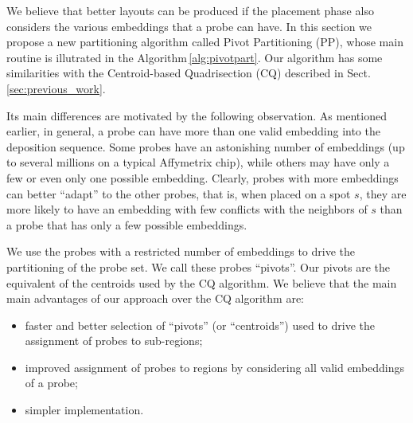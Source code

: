 \documentclass{llncs}
\begin{document}
We believe that better layouts can be produced if the placement phase also considers
the various embeddings that a probe can have. In this section we propose a new
partitioning algorithm called Pivot Partitioning (PP), whose main routine is
illutrated in the Algorithm\,\ref{alg:pivotpart}. Our algorithm
has some similarities with the Centroid-based Quadrisection (CQ) described
in Sect.\,\ref{sec:previous_work}.

Its main differences are motivated by the following observation.
As mentioned earlier, in general, a probe can have more than one valid embedding
into the deposition sequence. Some probes have an
astonishing number of embeddings (up to several millions on a typical
Affymetrix chip), while others may have only a few or even only one possible embedding.
Clearly, probes with more embeddings can better
``adapt'' to the other probes, that is, when placed on a spot $s$, they are more likely
to have an embedding with few conflicts with the neighbors of $s$ than a probe that has
only a few possible embeddings.

We use the probes with a restricted number of embeddings to drive the partitioning
of the probe set. We call these probes ``pivots''. Our pivots are the equivalent of the
centroids used by the CQ algorithm. We believe that the main main advantages of our
approach over the CQ algorithm are:

\begin{itemize}
\item faster and better selection of ``pivots'' (or ``centroids'') used to drive
the assignment of probes to sub-regions;
\item improved assignment of probes to regions by considering all valid embeddings
of a probe;
\item simpler implementation.
\end{itemize}
\end{document}

